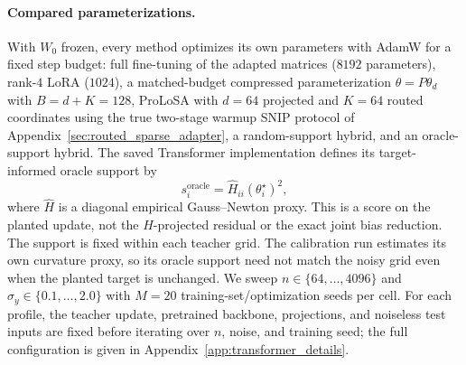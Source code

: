 \paragraph{Compared parameterizations.}
With $W_0$ frozen, every method optimizes its own parameters with AdamW for a
fixed step budget: full fine-tuning of the adapted matrices ($8192$
parameters), rank-$4$ LoRA ($1024$), a matched-budget compressed
parameterization $\theta=P\theta_d$ with $B=d+K=128$, ProLoSA with $d=64$
projected and $K=64$ routed coordinates using the true two-stage warmup SNIP
protocol of Appendix~\ref{sec:routed_sparse_adapter}, a random-support hybrid,
and an oracle-support hybrid.
The saved Transformer implementation defines its target-informed oracle support by
\begin{equation}
 s_i^{\mathrm{oracle}}=\widehat H_{ii}(\theta_i^\star)^2,
 \label{eq:transformer_oracle}
\end{equation}
where $\widehat H$ is a diagonal empirical Gauss--Newton proxy. This is a score on the planted update, not the $H$-projected residual or the exact joint bias reduction. The support is fixed within each teacher grid. The calibration run estimates its own curvature proxy, so its oracle support need not match the noisy grid even when the planted target is unchanged.
We sweep $n\in\{64,\ldots,4096\}$ and $\sigma_y\in\{0.1,\ldots,2.0\}$ with
$M=20$ training-set/optimization seeds per cell. For each profile, the teacher update, pretrained backbone, projections, and noiseless test inputs are fixed before iterating over $n$, noise, and training seed; the full
configuration is given in Appendix~\ref{app:transformer_details}.

